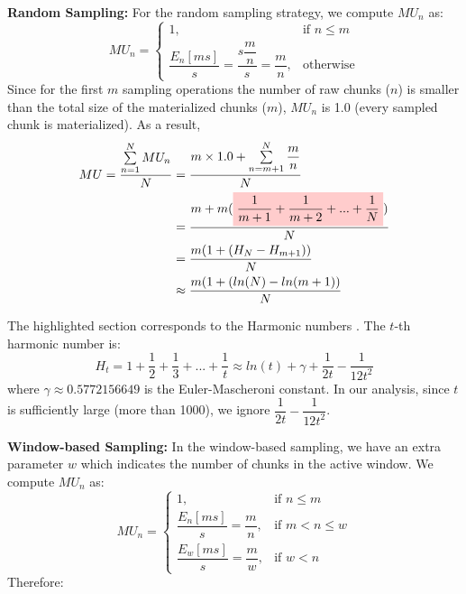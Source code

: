 \textbf{Random Sampling:} 
For the random sampling strategy, we compute $MU_n$ as:
\begin{equation*}
MU_n = 
\begin{cases}
    1, 	&\text{if } n \leq m\\
     \dfrac{E_n[ms]}{s} = \dfrac{s\dfrac{m}{n}}{s} = \dfrac{m}{n},   & \text{otherwise}
\end{cases}
\end{equation*}
Since for the first $m$ sampling operations the number of raw chunks ($n$) is smaller than the total size of the materialized chunks ($m$), $MU_n$ is 1.0 (every sampled chunk is materialized).
\newcommand{\highlight}[1]{%
  \colorbox{red!20}{$\displaystyle#1$}}
As a result, 
\begin{equation} \label{formula-uniform}
\begin{aligned}
MU=\dfrac{\sum\limits_{n=1}^N MU_n}{N}
&=\dfrac{m \times 1.0 + \sum\limits_{n = m+1}^{N} \dfrac{m}{n}}{N} \\
&=\dfrac{m  +  m (\highlight{\dfrac{1}{m+1} +\dfrac{1}{m+2}  + ... + \dfrac{1}{N}}) }{N}\\
&=\dfrac{m(1 + (H_N - H_{m+1}))}{N}\\
&\approx \dfrac{m( 1+(ln(N) - ln(m+1))}{N}
\end{aligned}
\end{equation}

The highlighted section corresponds to the Harmonic numbers \cite{sun2012arithmetic}.
The $t$-th harmonic number is:
\begin{equation*}
H_t = 1 + \dfrac{1}{2} + \dfrac{1}{3} + ... + \dfrac{1}{t} \approx ln(t) + \gamma + \dfrac{1}{2t} - \dfrac{1}{12t^2}
\end{equation*}
where $\gamma \approx 0.5772156649$ is the Euler-Mascheroni constant.
In our analysis, since $t$ is sufficiently large (more than 1000), we ignore $\dfrac{1}{2t} - \dfrac{1}{12t^2}$.

\textbf{Window-based Sampling:}
In the window-based sampling, we have an extra parameter $w$ which indicates the number of chunks in the active window.
We compute $MU_n$ as:
\begin{equation*}
MU_n = 
\begin{cases}
    1, 	&\text{if } n \leq m\\
     \dfrac{E_n[ms]}{s} = \dfrac{m}{n},   &\text{if } m < n \leq w\\
      \dfrac{E_w[ms]}{s} = \dfrac{m}{w},  &\text{if } w < n
\end{cases}
\end{equation*}
Therefore: 

